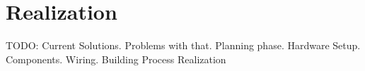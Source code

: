 \chapter{Realization}

TODO: Current Solutions. Problems with that. Planning phase. Hardware Setup. Components. Wiring. Building Process
Realization